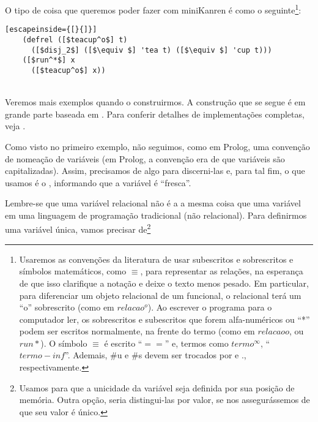 \documentclass{article}
\begin{document}
  O tipo de coisa que queremos poder fazer com miniKanren é como o
  seguinte\footnote{Usaremos as convenções da literatura de usar
    subescritos e sobrescritos e símbolos matemáticos, como $\equiv $, para
    representar as relações, na esperança de que isso clarifique a
    notação e deixe o texto menos pesado. Em particular, para
    diferenciar um objeto relacional de um funcional, o relacional
    terá um ``o'' sobrescrito (como em $relacao^o$). Ao escrever o
    programa para o computador ler, os sobrescritos e subescritos que
    forem alfa-numéricos ou ``*'' podem ser escritos normalmente, na
    frente do termo (como em $relacaoo$, ou $run*$). O símbolo $\equiv$ é
    escrito ``$==$'' e, termos como $termo^\infty$,
    ``$termo-inf$''. Ademais, \#u e \#s devem ser trocados por
     e ., respectivamente.}:
  \\

  \begin{lstlisting}[escapeinside={[}{]}]
    (defrel ([$teacup^o$] t)
      ([$disj_2$] ([$\equiv $] 'tea t) ([$\equiv $] 'cup t)))
    ([$run^*$] x
      ([$teacup^o$] x))
  \end{lstlisting}
  \hspace{1cm} \seta\ \\



  Veremos mais exemplos quando o construirmos. A construção que se segue
  é em grande parte baseada em \cite{will}. Para conferir detalhes de
  implementações completas, veja \cite{kanren}.

  Como visto no primeiro exemplo, não seguimos, como em Prolog, uma
  convenção de nomeação de variáveis (em Prolog, a convenção era de
  que variáveis são  capitalizadas). Assim, precisamos de algo para
  discerni-las e, para tal fim, o que usamos é o ,
  informando que a variável é ``fresca''.
  
  Lembre-se que uma variável relacional não é a a mesma
  coisa que uma variável em uma linguagem de programação tradicional
  (não relacional). Para definirmos uma variável única, vamos precisar
  de\footnote{Usamos  para que a unicidade da
    variável seja definida por sua posição de memória. Outra opção,
    seria distingui-las por valor, se nos assegurássemos de que seu valor
    é único.}
  
\end{document}
